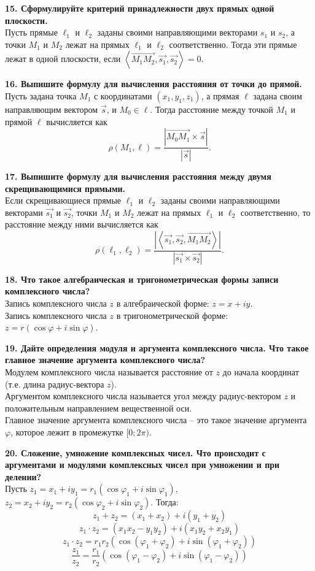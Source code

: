 \documentclass[11pt,a4paper]{article}
\newcommand{\vect}[1]{\overrightarrow{#1}}
\begin{document}
\textbf{15. Сформулируйте критерий принадлежности двух прямых одной плоскости.\\}
Пусть прямые $\ell_1$ и $\ell_2$ заданы своими направляющими векторами $s_1$ и $s_2$, а точки $M_1$ и $M_2$ лежат на прямых $\ell_1$ и $\ell_2$ соответственно. Тогда эти прямые лежат в одной плоскости, если $\left\langle \vect{M_1 M_2}, \vect{s_1}, \vect{s_2} \right\rangle = 0$.

\textbf{16. Выпишите формулу для вычисления расстояния от точки до прямой.\\}
Пусть задана точка $M_1$ с координатами $(x_1, y_1, z_1)$, а прямая $\ell$ задана своим направляющим вектором $\vect{s}$, и $M_0 \in \ell$. Тогда расстояние между точкой $M_1$ и прямой $\ell$ вычисляется как
$$\rho ( M_1, \ell ) = \frac{ \left\vert \vect{M_0 M_1} \times \vect{s} \right\vert }{ \left\vert \vect{s} \right\vert }.$$

\textbf{17. Выпишите формулу для вычисления расстояния между двумя скрещивающимися прямыми.\\}
Если скрещивающиеся прямые $\ell_1$ и $\ell_2$ заданы своими направляющими векторами $\vect{s_1}$ и $\vect{s_2}$, точки $M_1$ и $M_2$ лежат на прямых $\ell_1$ и $\ell_2$ соответственно, то расстояние между ними вычисляется как
$$\rho ( \ell_1, \ell_2 ) = \frac{ \left\vert \left\langle \vect{s_1}, \vect{s_2}, \vect{M_1 M_2} \right\rangle \right\vert }{ \left\vert \vect{s_1} \times \vect{s_2} \right\vert }.$$

\textbf{18. Что такое алгебраическая и тригонометрическая формы записи комплексного числа?\\}
Запись комплексного числа $z$ в алгебраической форме: $z = x + iy$.\\
Запись комплексного числа $z$ в тригонометрической форме: $z = r ( \cos \varphi + i \sin \varphi )$.
\pagebreak

\textbf{19. Дайте определения модуля и аргумента комплексного числа. Что такое главное значение аргумента комплексного числа?\\}
Модулем комплексного числа называется расстояние от $z$ до начала координат (т.е. длина радиус-вектора $z$).\\
Аргументом комплексного числа называется угол между радиус-вектором $z$ и положительным направлением вещественной оси.\\
Главное значение аргумента комплексного числа -- это такое значение аргумента $\varphi$, которое лежит в промежутке $[0; 2\pi)$.

\textbf{20. Сложение, умножение комплексных чисел. Что происходит с аргументами и модулями комплексных чисел при умножении и при делении?\\}
Пусть $z_1 = x_1 + i y_1 = r_1 ( \cos \varphi_1 + i \sin \varphi_1 )$, $z_2 = x_2 + i y_2 = r_2 ( \cos \varphi_2 + i \sin \varphi_2 )$. Тогда:
$$z_1 + z_2 = (x_1 + x_2) + i ( y_1 + y_2 )$$
$$z_1 \cdot z_2 = ( x_1 x_2 - y_1 y_2 ) + i (x_1 y_2 + x_2 y_1 )$$
$$z_1 \cdot z_2 = r_1 r_2 ( \cos ( \varphi_1 + \varphi_2 ) + i \sin ( \varphi_1 + \varphi_2 ) )$$
$$\frac{z_1}{z_2} = \frac{r_1}{r_2}( \cos ( \varphi_1 - \varphi_2 ) + i \sin ( \varphi_1 - \varphi_2 ) )$$
\end{document}
